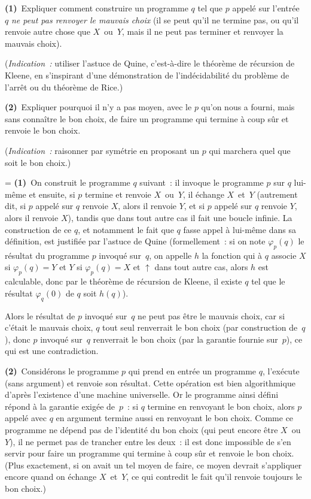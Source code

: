 \documentclass[12pt,a4paper]{article}
\theoremstyle{definition}
\newif\ifcorrige
\newenvironment{corrige}%
{\ifcorrige\relax\else\setbox0=\vbox\bgroup\fi%
\smallbreak\footnotesize\noindent{\underbar{\textit{Corrigé.}}\quad}}
{{\hbox{}\nobreak\hfill\checkmark}%
\ifcorrige\relax\else\egroup\fi\par}
\begin{document}
\textbf{(1)} Expliquer comment construire un programme $q$ tel que $p$
appelé sur l'entrée $q$ \emph{ne peut pas renvoyer le mauvais choix}
(il se peut qu'il ne termine pas, ou qu'il renvoie autre chose que
$X$ ou $Y$, mais il ne peut pas terminer et renvoyer la mauvais
choix).

(\emph{Indication :} utiliser l'astuce de Quine, c'est-à-dire le
théorème de récursion de Kleene, en s'inspirant d'une démonstration de
l'indécidabilité du problème de l'arrêt ou du théorème de Rice.)

\textbf{(2)} Expliquer pourquoi il n'y a pas moyen, avec le $p$ qu'on
nous a fourni, mais sans connaître le bon choix, de faire un programme
qui termine à coup sûr et renvoie le bon choix.

(\emph{Indication :} raisonner par symétrie en proposant un $p$ qui
marchera quel que soit le bon choix.)

\begin{corrige}
\textbf{(1)} On construit le programme $q$ suivant : il invoque le
programme $p$ sur $q$ lui-même et ensuite, si $p$ termine et renvoie
$X$ ou $Y$, il échange $X$ et $Y$ (autrement dit, si $p$ appelé sur
$q$ renvoie $X$, alors il renvoie $Y$, et si $p$ appelé sur $q$
renvoie $Y$, alors il renvoie $X$), tandis que dans tout autre cas il
fait une boucle infinie.  La construction de ce $q$, et notamment le
fait que $q$ fasse appel à lui-même dans sa définition, est justifiée
par l'astuce de Quine (formellement : si on note $\varphi_p(q)$ le
résultat du programme $p$ invoqué sur $q$, on appelle $h$ la fonction
qui à $q$ associe $X$ si $\varphi_p(q) = Y$ et $Y$ si $\varphi_p(q) =
X$ et $\uparrow$ dans tout autre cas, alors $h$ est calculable, donc
par le théorème de récursion de Kleene, il existe $q$ tel que le
résultat $\varphi_q(0)$ de $q$ soit $h(q)$).

Alors le résultat de $p$ invoqué sur $q$ ne peut pas être le mauvais
choix, car si c'était le mauvais choix, $q$ tout seul renverrait le
bon choix (par construction de $q$), donc $p$ invoqué sur $q$
renverrait le bon choix (par la garantie fournie sur $p$), ce qui est
une contradiction.

\textbf{(2)} Considérons le programme $p$ qui prend en entrée un
programme $q$, l'exécute (sans argument) et renvoie son résultat.
Cette opération est bien algorithmique d'après l'existence d'une
machine universelle.  Or le programme ainsi défini répond à la
garantie exigée de $p$ : si $q$ termine en renvoyant le bon choix,
alors $p$ appelé avec $q$ en argument termine aussi en renvoyant le
bon choix.  Comme ce programme ne dépend pas de l'identité du bon
choix (qui peut encore être $X$ ou $Y$), il ne permet pas de trancher
entre les deux : il est donc impossible de s'en servir pour faire un
programme qui termine à coup sûr et renvoie le bon choix.  (Plus
exactement, si on avait un tel moyen de faire, ce moyen devrait
s'appliquer encore quand on échange $X$ et $Y$, ce qui contredit le
fait qu'il renvoie toujours le bon choix.)
\end{corrige}
\end{document}
